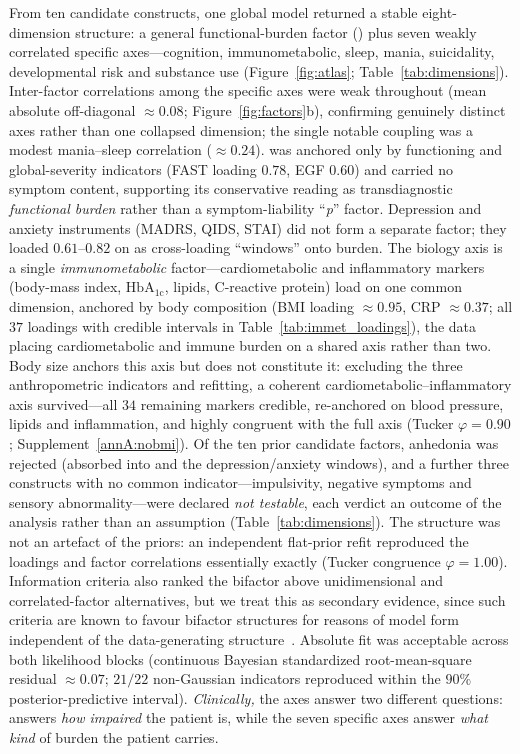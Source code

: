 From ten candidate constructs, one global model returned a stable eight-dimension
structure: a general functional-burden factor (\Gfac) plus seven weakly correlated
specific axes---cognition, immunometabolic, sleep, mania, suicidality, developmental
risk and substance use (Figure~\ref{fig:atlas}; Table~\ref{tab:dimensions}).
Inter-factor correlations among the specific axes were weak throughout (mean absolute
off-diagonal $\approx 0.08$; Figure~\ref{fig:factors}b), confirming genuinely distinct
axes rather than one collapsed dimension; the single notable coupling was a modest
mania--sleep correlation ($\approx 0.24$). \Gfac{} was anchored only by
functioning and global-severity indicators (FAST loading $0.78$, EGF $0.60$) and
carried no symptom content, supporting its conservative reading as transdiagnostic
\emph{functional burden} rather than a symptom-liability ``\textit{p}'' factor.
Depression and anxiety instruments (MADRS, QIDS, STAI) did not form a separate factor;
they loaded $0.61$--$0.82$ on \Gfac{} as cross-loading ``windows'' onto burden. The
biology axis is a single \emph{immunometabolic} factor---cardiometabolic and
inflammatory markers (body-mass index, $\mathrm{HbA_{1c}}$, lipids, C-reactive protein)
load on one common dimension, anchored by body composition (BMI loading $\approx 0.95$,
CRP $\approx 0.37$; all $37$ loadings with credible intervals in
Table~\ref{tab:immet_loadings}), the data placing cardiometabolic and immune burden on a
shared axis rather than two. Body size anchors this axis but does not constitute it:
excluding the three anthropometric indicators and refitting, a coherent
cardiometabolic--inflammatory axis survived---all $34$ remaining markers credible, re-anchored
on blood pressure, lipids and inflammation, and highly congruent with the full axis (Tucker
$\varphi=0.90$; Supplement~\ref{annA:nobmi}). Of the ten
prior candidate factors, anhedonia was rejected (absorbed into \Gfac{} and the
depression/anxiety windows), and a further three constructs with no common
indicator---impulsivity, negative symptoms and sensory abnormality---were declared
\emph{not testable}, each verdict an outcome of the analysis rather than an assumption
(Table~\ref{tab:dimensions}). The structure was not an artefact of the priors: an independent flat-prior refit reproduced
the loadings and factor correlations essentially exactly (Tucker congruence $\varphi = 1.00$).
Information criteria also ranked the bifactor above unidimensional and correlated-factor
alternatives, but we treat this as secondary evidence, since such criteria are known to favour
bifactor structures for reasons of model form independent of the data-generating
structure~\citep{bonifaycai2017,greene2019fit}. Absolute fit was
acceptable across both likelihood blocks (continuous Bayesian standardized
root-mean-square residual $\approx 0.07$; $21/22$ non-Gaussian indicators reproduced
within the $90\%$ posterior-predictive interval). \emph{Clinically,} the axes answer two
different questions: \Gfac{} answers \emph{how impaired} the patient is, while the seven
specific axes answer \emph{what kind} of burden the patient carries.

